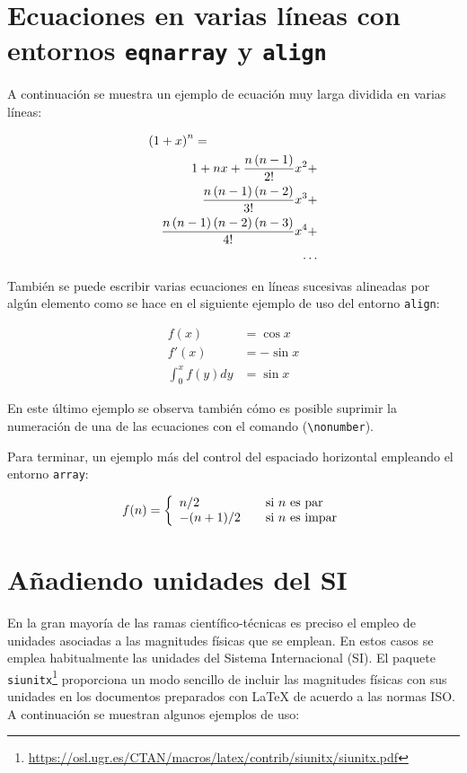 \documentclass[ 		%
	11pt,				%
	a4paper,			%
	twoside,			%
	openright,			%
	final       		%
]{book}
\begin{document}
\section{Ecuaciones en varias líneas con entornos \texttt{eqnarray} y \texttt{align}}
A continuación se muestra un ejemplo de ecuación muy larga dividida en varias líneas:

\begin{eqnarray*}
  \lefteqn{\left(1+x\right)^n = } \\
  & & 1 + nx + \frac{n\left(n-1\right)}{2!} x^2 + \\
  & & \frac{n\left(n-1\right)\left(n-2\right)}{3!} x^3 + \\
  & & \frac{n\left(n-1\right)\left(n-2\right)\left(n-3\right)}{4!} x^4 + \\
  & & \ldots
\end{eqnarray*}

También se puede escribir varias ecuaciones en líneas sucesivas alineadas por algún elemento como se hace en el siguiente ejemplo de uso del entorno \texttt{align}:

\begin{align}
f(x) & = \cos x \\
f'(x) & = -\sin x \\
\int_{0}^{x} f(y)dy & = \sin x \nonumber
\end{align}

\noindent En este último ejemplo se observa también cómo es posible suprimir la numeración de una de las ecuaciones con el comando (\texttt{\textbackslash nonumber}).

Para terminar, un ejemplo más del control del espaciado horizontal empleando el entorno \texttt{array}:

\[f(n) = \left\{ 
\begin{array}{l l}
  n/2 & \quad \mbox{si $n$ es par}\\
  -(n+1)/2 & \quad \mbox{si $n$ es impar}\\ \end{array} \right. \]


\section{Añadiendo unidades del SI}
En la gran mayoría de las ramas científico-técnicas es preciso el empleo de unidades asociadas a las magnitudes físicas que se emplean. En estos casos se emplea habitualmente las unidades del Sistema Internacional (SI). El paquete \texttt{siunitx}\footnote{\url{https://osl.ugr.es/CTAN/macros/latex/contrib/siunitx/siunitx.pdf}} proporciona un modo sencillo de incluir las magnitudes físicas con sus unidades en los documentos preparados con \LaTeX{} de acuerdo a las normas ISO. A continuación se muestran algunos ejemplos de uso:
\end{document}
